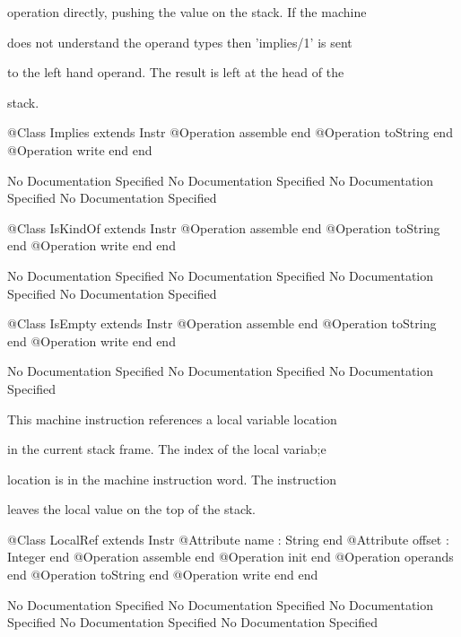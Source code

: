       operation directly, pushing the value on the stack. If the machine

      does not understand the operand types then 'implies/1' is sent

      to the left hand operand. The result is left at the head of the

      stack.
\begin{Interface}
@Class Implies extends Instr
  @Operation assemble end
  @Operation toString end
  @Operation write end
end
\end{Interface}
No Documentation Specified
No Documentation Specified
No Documentation Specified
No Documentation Specified
\begin{Interface}
@Class IsKindOf extends Instr
  @Operation assemble end
  @Operation toString end
  @Operation write end
end
\end{Interface}
No Documentation Specified
No Documentation Specified
No Documentation Specified
No Documentation Specified
\begin{Interface}
@Class IsEmpty extends Instr
  @Operation assemble end
  @Operation toString end
  @Operation write end
end
\end{Interface}
No Documentation Specified
No Documentation Specified
No Documentation Specified

      This machine instruction references a local variable location

      in the current stack frame. The index of the local variab;e

      location is in the machine instruction word. The instruction

      leaves the local value on the top of the stack.
\begin{Interface}
@Class LocalRef extends Instr
  @Attribute name : String end
  @Attribute offset : Integer end
  @Operation assemble end
  @Operation init end
  @Operation operands end
  @Operation toString end
  @Operation write end
end
\end{Interface}
No Documentation Specified
No Documentation Specified
No Documentation Specified
No Documentation Specified
No Documentation Specified

